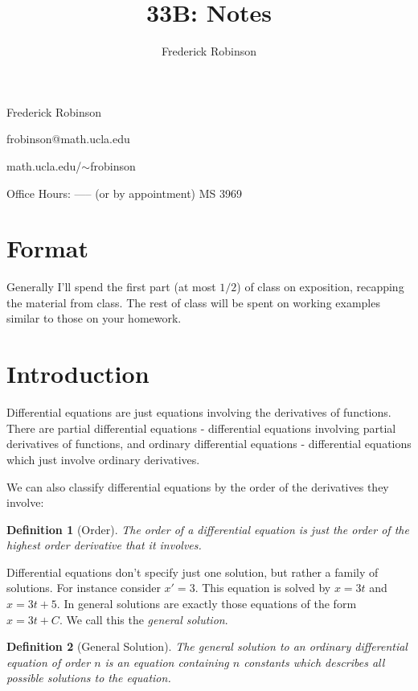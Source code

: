 \documentclass[14pt]{article}
\title{33B: Notes}
\author{Frederick Robinson}
\newtheorem{defn}{Definition}
\begin{document}
\maketitle

\pagebreak

Frederick Robinson

frobinson@math.ucla.edu

math.ucla.edu/$\sim$frobinson

Office Hours: ----- (or by appointment)
MS 3969

\section*{Format}

Generally I'll spend the first part (at most $1/2$) of class on exposition, recapping the material
from class. The rest of class will be spent on working examples similar to those on your homework. 

\pagebreak

\section{Introduction}

Differential equations are just equations involving the derivatives of functions. There are partial
differential equations - differential equations involving partial derivatives of functions, and
ordinary differential equations - differential equations which just involve ordinary derivatives. 

We can also classify differential equations by the order of the derivatives they involve:
\begin{defn}[Order]The \emph{order} of a differential equation is just the order of the highest
  order derivative that it involves.\end{defn}

Differential equations don't specify just one solution, but rather a family of solutions. For
instance consider $x' = 3$. This equation is solved by $x = 3t$ and $x = 3t + 5$. In general
solutions are exactly those equations of the form $x = 3t + C$. We call this the \emph{general
  solution}.

\begin{defn}[General Solution]
  The \emph{general solution} to an ordinary differential equation of order $n$ is an equation
  containing $n$ constants which describes all possible solutions to the equation. 
\end{defn}
\end{document}
